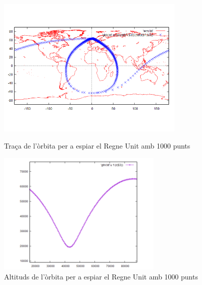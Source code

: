 \documentclass[12pt]{article}
\begin{document}
\begin{figure}
\centering
\includegraphics[width=0.8\textwidth]{orbita-UK.png}
\caption{Traça de l'òrbita per a espiar el Regne Unit amb 1000 punts}
\label{fig:my_label}

\includegraphics[width=0.7\textwidth]{altitud-UK.png}
\caption{Altituds de l'òrbita per a espiar el Regne Unit amb 1000 punts}
\label{fig:relacio-anomalies}
\end{figure}
\end{document}
